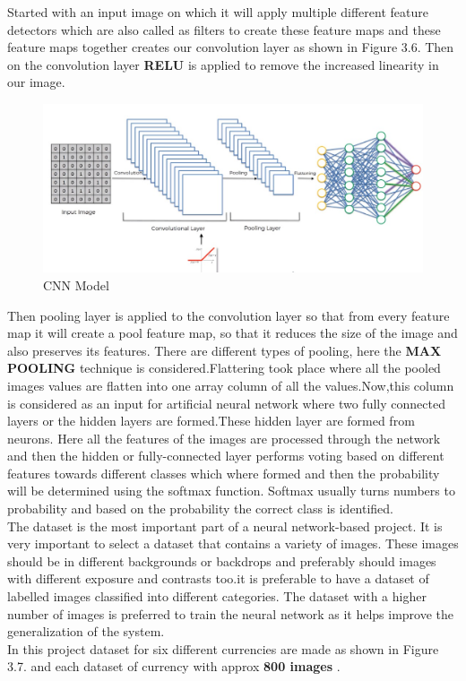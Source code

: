 \noindent Started with an input image on which it will apply multiple different feature detectors which are also called as filters to create these feature maps and these feature maps together creates our convolution layer as shown in Figure 3.6. Then on the convolution layer {\bf RELU} is applied to remove the increased linearity in our image.\\
\begin{figure}[h!]
	\centering
	\includegraphics[width=1\textwidth]{CHAPTERS/m6.jpeg}
	\caption{CNN Model}
\end{figure}
\noindent Then pooling layer is applied to the convolution layer so that from every feature map it will create a pool feature map, so that it reduces the size of the image and also preserves its features. There are different types of pooling, here the {\bf MAX POOLING} technique is considered.Flattering took place where all the pooled images values are flatten into one array column of all the values.Now,this column is considered as an input for artificial neural network where two fully connected layers or the hidden layers are formed.These hidden layer are formed from neurons. Here all the features of the images are processed through the network and then the hidden or fully-connected layer performs voting based on different features towards different classes which where formed and then the probability will be determined using the softmax function. Softmax usually turns numbers to probability and based on the probability the correct class is identified.
\citeauthor{9020108}
\newpage
{}\\
\noindent The dataset is the most important part of a neural network-based project. It is very important to select a dataset that contains a variety of images. These images should be in different backgrounds or backdrops and preferably should images with different exposure and contrasts too.it is preferable to have a dataset of labelled images classified into different categories. The dataset with a higher number of images is preferred to train the neural network as it helps improve the generalization of the system.\\In this project dataset for six different currencies are made as shown in Figure 3.7. and each dataset of currency with approx {\bf 800 images} .\\\\
